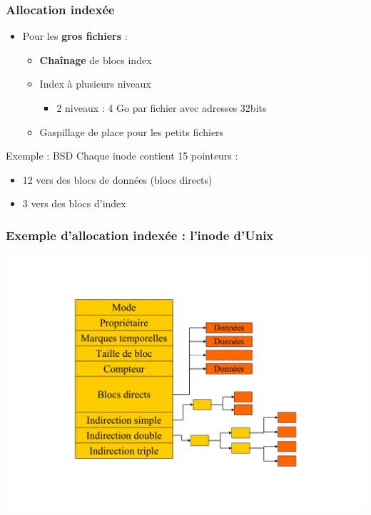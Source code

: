 \begin{frame}
\frametitle{Allocation indexée}
\begin{itemize}
\item Pour les \textbf{gros fichiers} :
\begin{itemize}
\item \textbf{Chaînage} de blocs index
\item Index à plusieurs niveaux
\begin{itemize}
\item 2 niveaux : 4 Go par fichier avec adresses 32bits
\end{itemize}
\item Gaspillage de place pour les petits fichiers
\end{itemize}
\end{itemize}

\begin{exampleblock}{Exemple : BSD}
Chaque inode contient 15 pointeurs :
\begin{itemize}
\item 12 vers des blocs de données (blocs directs)
\item 3 vers des blocs d'index
\end{itemize}
\end{exampleblock}
\end{frame}


\begin{frame}
\frametitle{Exemple d'allocation indexée : l'inode d'Unix}
\includegraphics[width=.7\textwidth]{../illustration/inode_unix.pdf}
\end{frame}

